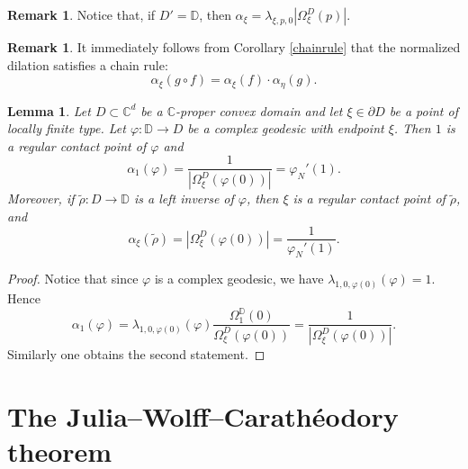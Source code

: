\documentclass[11pt, reqno]{amsart}
\numberwithin{equation}{section}
\newtheorem{lemma}[theorem]{Lemma}
\theoremstyle{definition}
\newtheorem{remark}[theorem]{Remark}
\newcommand{\C}{\mathbb{C}}
\newcommand{\D}{\mathbb{D}}
\begin{document}
{{{		\begin{remark} 
			Notice that, if $D'=\D$, then  $\alpha_\xi=\lambda_{\xi,p,0}|\Omega^D_\xi(p)|$.
		\end{remark}
		\begin{remark}
			It immediately follows from Corollary \ref{chainrule} that the normalized dilation satisfies a chain rule:
			\begin{equation*}\label{omegachainrule}\alpha_\xi( g\circ f)=\alpha_\xi(f)\cdot\alpha_\eta(g).
			\end{equation*}
		\end{remark}
		\begin{lemma}\label{dilgeoinv}
			Let $D\subset\C^d$ be a $\C$-proper convex domain and let $\xi\in\partial D$ be a point of locally finite type.
			Let $\varphi\colon \D\to D$ be a complex geodesic with endpoint $\xi$. Then $1$ is a regular contact point of $\varphi$ and
			$$\alpha_{1}(\varphi)=\frac{1}{|\Omega^D_\xi(\varphi(0))|}=\varphi_N'(1).$$ 
			Moreover, if
			$\tilde{\rho}\colon D\to \D$ is a  left inverse of $\varphi$, 
			then $\xi$ is a regular contact point of $\tilde{\rho}$, and
			$$ \alpha_\xi(\tilde{\rho})=|\Omega^D_\xi(\varphi(0))|=\frac{1}{\varphi_N'(1)}.$$
		\end{lemma}
		\begin{proof}
			Notice that since $\varphi$ is a complex geodesic, we have $\lambda_{1,0,\varphi(0)}(\varphi)=1.$ Hence
			$$\alpha_1(\varphi)=\lambda_{1,0,\varphi(0)}(\varphi)\frac{\Omega_1^\D(0)}{\Omega_\xi^D(\varphi(0))}=\frac{1}{|\Omega^D_\xi(\varphi(0))|}.$$ Similarly one obtains the second statement.
			
		\end{proof}
		
		
		\section{The Julia--Wolff--Carath\'eodory theorem}
		
}}}
\end{document}
